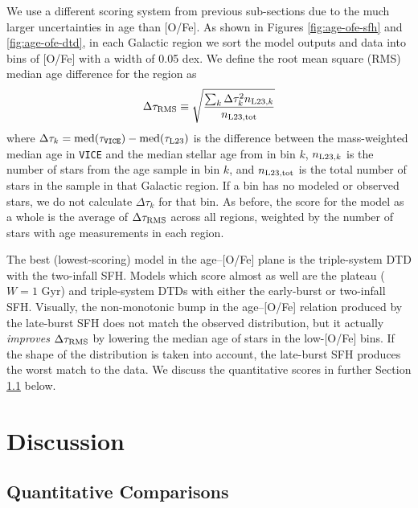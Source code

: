 \documentclass[twocolumn,twocolappendix,linenumbers]{aastex631}
\newcommand{\vice}{{\tt VICE}\xspace}
\begin{document}
We use a different scoring system from previous sub-sections due to the much larger uncertainties in age than [O/Fe]. As shown in Figures \ref{fig:age-ofe-sfh} and \ref{fig:age-ofe-dtd}, in each Galactic region we sort the model outputs and data into bins of [O/Fe] with a width of 0.05 dex. We define the root mean square (RMS) median age difference for the region as
\begin{equation}
    \Delta\tau_{\rm RMS} \equiv \sqrt{\frac{\sum_k \Delta\tau_k^2 n_{{\rm L23},k}}{n_{\rm L23,tot}}}
    \label{eq:age-ofe-score}
\end{equation}
where $\Delta\tau_k=\rm{med}(\tau_{\rm \vice})-\rm{med}(\tau_{\rm L23})$ is the difference between the mass-weighted median age in \vice and the median stellar age from  in bin $k$, $n_{{\rm L23},k}$ is the number of stars from the  age sample in bin $k$, and $n_{\rm L23,tot}$ is the total number of stars in the sample in that Galactic region. If a bin has no modeled or observed stars, we do not calculate $\Delta \tau_k$ for that bin. As before, the score for the model as a whole is the average of $\Delta \tau_{\rm RMS}$ across all regions, weighted by the number of stars with age measurements in each region.

The best (lowest-scoring) model in the age--[O/Fe] plane is the triple-system DTD with the two-infall SFH. Models which score almost as well are the plateau ($W=1$ Gyr) and triple-system DTDs with either the early-burst or two-infall SFH. Visually, the non-monotonic bump in the age--[O/Fe] relation produced by the late-burst SFH does not match the observed distribution, but it actually {\it improves} $\Delta \tau_{\rm RMS}$ by lowering the median age of stars in the low-[O/Fe] bins. If the shape of the distribution is taken into account, the late-burst SFH produces the worst match to the data.
We discuss the quantitative scores in further Section \ref{sec:discussion-scores} below.

\section{Discussion}
\label{sec:discussion}

\subsection{Quantitative Comparisons}
\label{sec:discussion-scores}

\vspace{-24pt}
\end{document}
